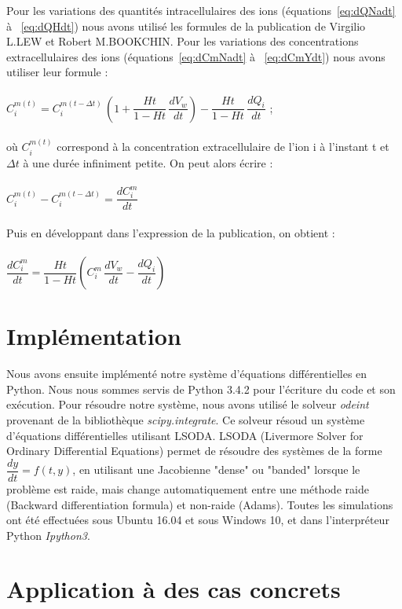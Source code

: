 \documentclass[a4paper,fleqn]{article}
\begin{document}
Pour les variations des quantités intracellulaires des ions (équations~\eqref{eq:dQNadt} à ~\eqref{eq:dQHdt}) nous avons utilisé les formules de la publication de Virgilio L.LEW et Robert M.BOOKCHIN. Pour les variations des concentrations extracellulaires des ions (équations~\eqref{eq:dCmNadt} à ~\eqref{eq:dCmYdt}) nous avons utiliser leur formule :\\
\\
$C_i^{m(t)}=C_i^{m(t-\Delta{t})}\,\left(1 + \dfrac{Ht}{1 - Ht}\,\dfrac{dV_w}{dt}\right) - \dfrac{Ht}{1 - Ht}\,\dfrac{dQ_{i}}{dt}$ ; \\
\\
où $C_i^{m(t)}$ correspond à la concentration extracellulaire de l'ion i à l'instant t et $\Delta{t}$ à une durée infiniment petite. On peut alors écrire :\\
\\
$C_i^{m(t)} - C_i^{m(t-\Delta{t})} = \dfrac{dC_{i}^m}{dt}$\\
\\
Puis en développant dans l'expression de la publication, on obtient :\\
\\
$\dfrac{dC_{i}^m}{dt}=\dfrac{Ht}{1 - Ht}\left(C_{i}^m\,\dfrac{dV_w}{dt}-\dfrac{dQ_{i}}{dt}\right)$


\section{Implémentation}   

Nous avons ensuite implémenté notre système d'équations différentielles en Python. Nous nous sommes servis de Python 3.4.2 pour l'écriture du code et son exécution. Pour résoudre notre système, nous avons utilisé le solveur \textit{odeint} provenant de la bibliothèque \textit{scipy.integrate}. Ce solveur résoud un système d'équations différentielles utilisant LSODA. LSODA (Livermore Solver for Ordinary Differential Equations) permet de résoudre des systèmes de la forme $\dfrac{dy}{dt}=f\left(t,y\right)$, en utilisant une Jacobienne "dense" ou "banded" lorsque le problème est raide, mais change automatiquement entre une méthode raide (Backward differentiation formula) et non-raide (Adams).
Toutes les simulations ont été effectuées sous Ubuntu 16.04 et sous Windows 10, et dans l'interpréteur Python \textit{Ipython3}.
   






\section{Application à des cas concrets}     
\end{document}
